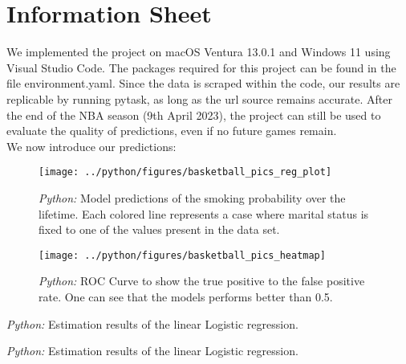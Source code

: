 \documentclass[11pt, a4paper, leqno]{article}
\begin{document}
\section{Information Sheet}

We implemented the project on macOS Ventura 13.0.1 and Windows 11 using Visual Studio Code. The packages required for this project can be found in the file environment.yaml.
Since the data is scraped within the code, our results are replicable by running pytask, as long as the url source remains accurate.
After the end of the NBA season (9th April 2023), the project can still be used to evaluate the quality of predictions, even if no future games remain.\\

We now introduce our predictions:


\begin{figure}[H]
\centering
\texttt{[image: ../python/figures/basketball\_pics\_reg\_plot]}
\caption{\emph{Python:} Model predictions of the smoking probability over the lifetime. Each colored line represents a case where marital status is fixed to one of the values present in the data set.}
    \label{fig:python-reg_plot}

\end{figure}

\begin{figure}[H]

    \centering
    \texttt{[image: ../python/figures/basketball\_pics\_heatmap]}

    \caption{\emph{Python:} ROC Curve to show the true positive to the false positive rate. One can see that the models performs better than 0.5.}
    \label{fig:python-heatmap}

\end{figure}

\begin{table}[!h]
    
    \caption{\label{tab:python-inference_model}\emph{Python:} Estimation results of the
        linear Logistic regression.}
\end{table}


\begin{table}[!h]
    
    \caption{\label{tab:python-table_playoffs}\emph{Python:} Estimation results of the
        linear Logistic regression.}
\end{table}
\end{document}
